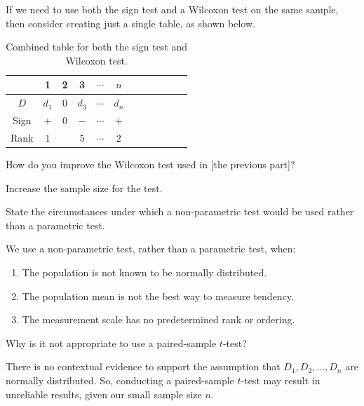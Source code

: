 \documentclass[../Notes.tex]{subfiles}
\begin{document}
\begin{note}
  If we need to use both the sign test and a Wilcoxon test on the same sample, then consider creating just a single table, as shown below. 
  \begin{table}[H]
    \centering
    \begin{tabular}{|Sc|Sc|Sc|Sc|Sc|Sc|}
       & 1 & 2 & 3 & \(\cdots\) & \(n\)\\
      \hline 
      \(D\) & \(d_1\) & \(0\) & \(d_3\) & \(\cdots\) & \(d_n\)\\
      \hline
      Sign & \(+\) & \(0\) & \(-\) & \(\cdots\) & \(+\)\\
      \hline
      Rank & \(1\) &  & \(5\) & \(\cdots\) & \(2\)\\
      \hline
    \end{tabular}
    \caption{Combined table for both the sign test and Wilcoxon test.}
    \label{table:sign-Wilcoxon-combined}
  \end{table}
\end{note}
\begin{note}
  How do you improve the Wilcoxon test used in [the previous part]?
  \begin{center}
    Increase the sample size for the test.
  \end{center}
\end{note}
\begin{note}
  State the circumstances under which a non-parametric test would be used rather than a parametric test.
  \begin{center}
    \parbox{0.9\textwidth}{
      We use a non-parametric test, rather than a parametric test, when:
      \begin{enumerate}
        \item The population is not known to be normally distributed.
        \item The population mean is not the best way to measure tendency.
        \item The measurement scale has no predetermined rank or ordering. 
      \end{enumerate}
    }
  \end{center}
\end{note}
\begin{note}
  Why is it not appropriate to use a paired-sample \(t\)-test? 
  \begin{center}
    \parbox{0.9\textwidth}{
      There is no contextual evidence to support the assumption that \(D_1,D_2,\dots,D_n\) are normally distributed. So, conducting a paired-sample \(t\)-test may result in unreliable results, given our small sample size \(n\). 
    }
  \end{center}
\end{note}
\end{document}
